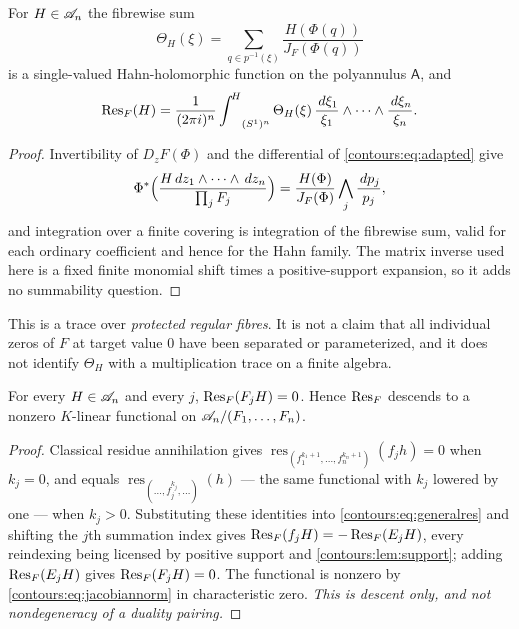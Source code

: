 \documentclass[11pt,letterpaper]{article}
\theoremstyle{definition}
\theoremstyle{remark}
\newcommand{\res}{\operatorname{res}}\newcommand{\wind}{\operatorname{wind}}
\newcommand{\HInt}{\mathop{\int^{\!H}}\nolimits}
\numberwithin{equation}{section}
\begin{document}
\begin{corollary}
\label{contours:cor:protectedtrace}
For $H\in\mathscr A_n$ the fibrewise sum
\[
  \Theta_H(\xi)=\sum_{q\in p^{-1}(\xi)}
  \frac{H(\Phi(q))}{J_F(\Phi(q))}
\]
is a single-valued Hahn-holomorphic function on the polyannulus $\mathsf A$, and
\begin{equation}\label{contours:eq:finitetrace}
  \Res_F(H)=\frac1{(2\pi i)^n}
  \HInt_{(S^1)^n}\Theta_H(\xi)\,
  \frac{\dd\xi_1}{\xi_1}\wedge\cdots\wedge\frac{\dd\xi_n}{\xi_n} .
\end{equation}
\end{corollary}
\begin{proof}
Invertibility of $D_zF(\Phi)$ and the differential of
\eqref{contours:eq:adapted} give
\[
  \Phi^*\Bigl(\frac{H\,d z_1\wedge\cdots\wedge \,d z_n}{\prod_jF_j}\Bigr)
  =\frac{H(\Phi)}{J_F(\Phi)}\bigwedge_j\frac{\,d p_j}{p_j},
\]
and integration over a finite covering is integration of the fibrewise sum,
valid for each ordinary coefficient and hence for the Hahn family. The matrix
inverse used here is a fixed finite monomial shift times a positive-support
expansion, so it adds no summability question.
\end{proof}

This is a trace over \emph{protected regular fibres}. It is not a claim that all
individual zeros of $F$ at target value $0$ have been separated or
parameterized, and it does not identify $\Theta_H$ with a multiplication trace on
a finite algebra.

\begin{proposition}
\label{contours:prop:idealannihilation}
For every $H\in\mathscr A_n$ and every $j$, $\operatorname{Res}_F(F_jH)=0$. Hence $\operatorname{Res}_F$ descends to
a nonzero $K$-linear functional on $\mathscr A_n/(F_1,\ldots,F_n)$.
\end{proposition}
\begin{proof}
Classical residue annihilation gives
$\res_{(f_1^{k_1+1},\ldots,f_n^{k_n+1})}(f_jh)=0$ when $k_j=0$, and equals
$\res_{(\ldots,f_j^{k_j},\ldots)}(h)$ --- the same functional with $k_j$ lowered
by one --- when $k_j>0$. Substituting these identities into
\eqref{contours:eq:generalres} and shifting the $j$th summation index gives
$\operatorname{Res}_F(f_jH)=-\operatorname{Res}_F(E_jH)$, every reindexing being licensed by positive
support and \cref{contours:lem:support}; adding $\operatorname{Res}_F(E_jH)$ gives
$\operatorname{Res}_F(F_jH)=0$. The functional is nonzero by
\eqref{contours:eq:jacobiannorm} in characteristic zero. \emph{This is descent
only, and not nondegeneracy of a duality pairing.}
\end{proof}
\end{document}
